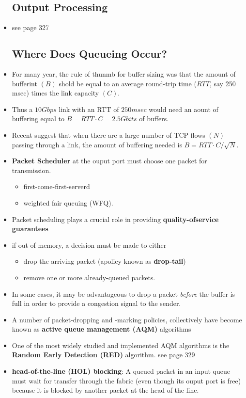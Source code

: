 \documentclass{article}
\begin{document}
\begin{itemize}
\subsection{Output Processing}
\item see page 327
\subsection{Where Does Queueing Occur?}
\item For many year, the rule of thunmb for buffer sizing was that the
  amount of bufferint $(B)$ shold be equal to an average round-trip
  time ($RTT$, say 250 msec) times the link capacity $(C)$.
\item Thus a $10 Gbps$ link with an RTT of $250 msec$ would need an
  aount of buffering equal to $B=RTT\cdot C=2.5 Gbits$ of buffers.
\item Recent suggest that when there are a large number of TCP flows
  $(N)$ passing through a link, the amount of buffering needed is
  $B=RTT\cdot C/ \sqrt{N}$.
\item \textbf{Packet Scheduler} at the ouput port must choose one
  packet for transmission.
\begin{itemize}
\item first-come-first-serverd
\item weighted fair queuing (WFQ).
\end{itemize}
\item Packet scheduling plays a crucial role in providing
  \textbf{quality-ofservice guarantees}
\item if out of memory, a decision must be made to either
\begin{itemize}
\item drop the arriving packet (apolicy known as \textbf{drop-tail})
\item remove one or more already-queued packets.
\end{itemize}
\item In some cases, it may be advantageous to drop a packet
  \emph{before} the buffer is full in order to provide a congestion
  signal to the sender.
\item A number of packet-dropping and -marking policies, collectively
  have become known as \textbf{active queue management (AQM)}
  algorithms
\item One of the most widely studied and implemented AQM algorithms is
  the \textbf{Random Early Detection (RED)} algorithm. see page 329
\item \textbf{head-of-the-line (HOL) blocking}: A queued packet in an
  input queue must wait for transfer through the fabric (even though
  its ouput port is free) because it is blocked by another packet at
  the head of the line.

\end{itemize}
\end{document}
